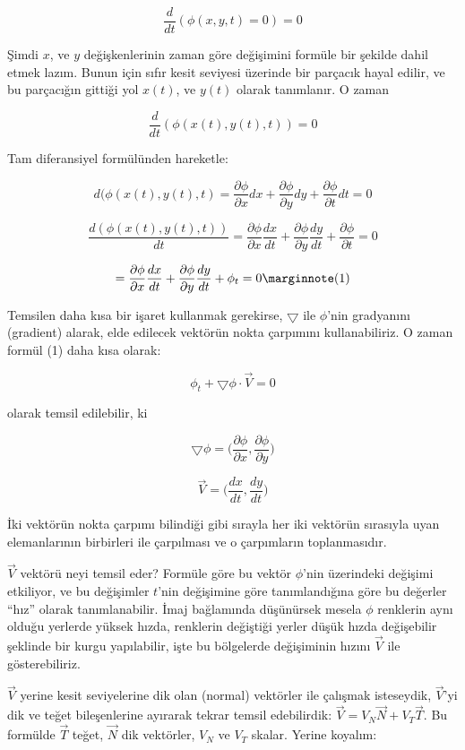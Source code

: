\documentclass[12pt,fleqn]{article}\usepackage{../../common}
\begin{document}
$$ \frac{d}{dt}(\phi(x,y,t) = 0) = 0 $$

Şimdi $x$, ve $y$ değişkenlerinin zaman göre değişimini formüle bir
şekilde dahil etmek lazım. Bunun için sıfır kesit seviyesi üzerinde
bir parçacık hayal edilir, ve bu parçacığın gittiği yol $x(t)$, ve
$y(t)$ olarak tanımlanır. O zaman

$$ \frac{d}{dt}(\phi(x(t),y(t),t)) = 0 $$

Tam diferansiyel formülünden hareketle:

$$ 
d(\phi(x(t),y(t),t) = 
\frac{\partial \phi}{\partial x}dx + 
\frac{\partial \phi}{\partial y}dy + 
\frac{\partial \phi}{\partial t}dt  = 0
 $$

$$ 
\frac{d(\phi(x(t),y(t),t))}{dt} = 
\frac{\partial \phi}{\partial x}\frac{dx}{dt} + 
\frac{\partial \phi}{\partial y}\frac{dy}{dt} + 
\frac{\partial \phi}{\partial t} = 0
 $$

$$
 = 
\frac{\partial \phi}{\partial x}\frac{dx}{dt} + 
\frac{\partial \phi}{\partial y}\frac{dy}{dt} + 
\phi_t = 0
\mlabel{1}
$$

Temsilen daha kısa bir işaret kullanmak gerekirse, $\bigtriangledown$
ile $\phi$'nin gradyanını (gradient) alarak, elde edilecek vektörün
nokta çarpımını kullanabiliriz.  O zaman formül (1) daha kısa
olarak:

$$ \phi_t + \bigtriangledown \phi \cdot \vec{V} = 0 $$

olarak temsil edilebilir, ki

$$ \bigtriangledown \phi = \bigg(
\frac{\partial \phi}{\partial x},
\frac{\partial \phi}{\partial y} \bigg)
 $$

$$ \vec{V} = \bigg(
\frac{dx}{dt} ,
\frac{dy}{dt} \bigg)
 $$

İki vektörün nokta çarpımı bilindiği gibi sırayla her iki vektörün
sırasıyla uyan elemanlarının birbirleri ile çarpılması ve o
çarpımların toplanmasıdır.

$\vec{V}$ vektörü neyi temsil eder? Formüle göre bu vektör $\phi$'nin
üzerindeki değişimi etkiliyor, ve bu değişimler $t$'nin değişimine
göre tanımlandığına göre bu değerler ``hız'' olarak
tanımlanabilir. İmaj bağlamında düşünürsek mesela $\phi$ renklerin
aynı olduğu yerlerde yüksek hızda, renklerin değiştiği yerler düşük
hızda değişebilir şeklinde bir kurgu yapılabilir, işte bu bölgelerde
değişiminin hızını $\vec{V}$ ile gösterebiliriz.

$\vec{V}$ yerine kesit seviyelerine dik olan (normal) vektörler ile çalışmak
isteseydik, $\vec{V}$'yi dik ve teğet bileşenlerine ayırarak tekrar temsil
edebilirdik: $\vec{V} = V_N\vec{N} + V_T\vec{T}$. Bu formülde $\vec{T}$ teğet,
$\vec{N}$ dik vektörler, $V_N$ ve $V_T$ skalar. Yerine koyalım:
\end{document}

